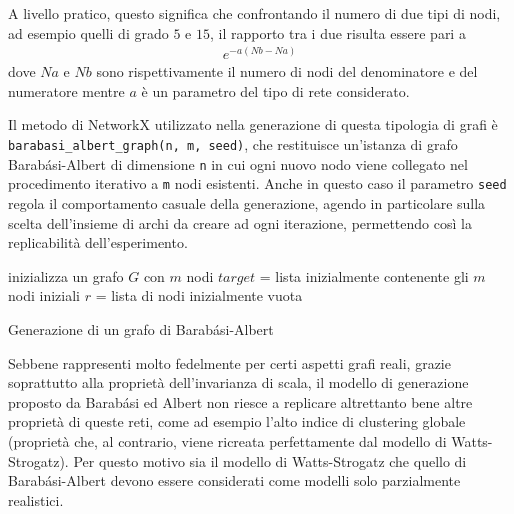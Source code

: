 A livello pratico, questo significa che confrontando il numero di due tipi di nodi, ad esempio quelli di grado $5$ e $15$, il rapporto tra i due risulta essere pari a
\begin{align*}
e^{-a(Nb-Na)}
\end{align*}
dove $Na$ e $Nb$ sono rispettivamente il numero di nodi del denominatore e del numeratore mentre $a$ è un parametro del tipo di rete considerato.

Il metodo di NetworkX utilizzato nella generazione di questa tipologia di grafi è\\
\texttt{barabasi\_albert\_graph(n, m, seed)}, che restituisce un'istanza di grafo Barabási-Albert di dimensione \texttt{n} in cui ogni nuovo nodo viene collegato nel procedimento iterativo a \texttt{m} nodi esistenti. Anche in questo caso il parametro \texttt{seed} regola il comportamento casuale della generazione, agendo in particolare sulla scelta dell'insieme di archi da creare ad ogni iterazione, permettendo così la replicabilità dell'esperimento. 

\begin{algorithm}
\SetAlgoLined
{}
 inizializza un grafo $G$ con $m$ nodi\;
 $target$ = lista inizialmente contenente gli $m$ nodi iniziali\;
 $r$ = lista di nodi inizialmente vuota\;
 \caption{Generazione di un grafo di Barabási-Albert}
 \label{alg:bag}
\end{algorithm}

Sebbene rappresenti molto fedelmente per certi aspetti grafi reali, grazie soprattutto alla proprietà dell'invarianza di scala, il modello di generazione proposto da Barabási ed Albert non riesce a replicare altrettanto bene altre proprietà di queste reti, come ad esempio l'alto indice di clustering globale (proprietà che, al contrario, viene ricreata perfettamente dal modello di Watts-Strogatz). Per questo motivo sia il modello di Watts-Strogatz che quello di Barabási-Albert devono essere considerati come modelli solo parzialmente realistici.

\newpage
